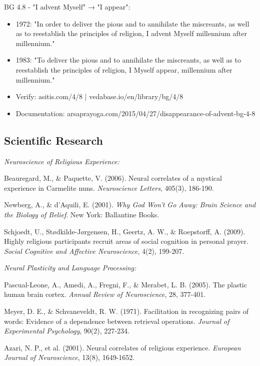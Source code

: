 \documentclass[12pt]{article}
\begin{document}
BG 4.8 - "I advent Myself" → "I appear":
\begin{itemize}
\item 1972: "In order to deliver the pious and to annihilate the miscreants, as well as to reestablish the principles of religion, I advent Myself millennium after millennium."
\item 1983: "To deliver the pious and to annihilate the miscreants, as well as to reestablish the principles of religion, I Myself appear, millennium after millennium."
\item Verify: asitis.com/4/8 | vedabase.io/en/library/bg/4/8
\item Documentation: arsaprayoga.com/2015/04/27/disappearance-of-advent-bg-4-8
\end{itemize}

\vspace{0.5cm}

\subsection*{Scientific Research}

\textit{Neuroscience of Religious Experience:}

Beauregard, M., \& Paquette, V. (2006). Neural correlates of a mystical experience in Carmelite nuns. \textit{Neuroscience Letters}, 405(3), 186-190.

Newberg, A., \& d'Aquili, E. (2001). \textit{Why God Won't Go Away: Brain Science and the Biology of Belief}. New York: Ballantine Books.

Schjoedt, U., Stødkilde-Jørgensen, H., Geertz, A. W., \& Roepstorff, A. (2009). Highly religious participants recruit areas of social cognition in personal prayer. \textit{Social Cognitive and Affective Neuroscience}, 4(2), 199-207.

\textit{Neural Plasticity and Language Processing:}

Pascual-Leone, A., Amedi, A., Fregni, F., \& Merabet, L. B. (2005). The plastic human brain cortex. \textit{Annual Review of Neuroscience}, 28, 377-401.

Meyer, D. E., \& Schvaneveldt, R. W. (1971). Facilitation in recognizing pairs of words: Evidence of a dependence between retrieval operations. \textit{Journal of Experimental Psychology}, 90(2), 227-234.

Azari, N. P., et al. (2001). Neural correlates of religious experience. \textit{European Journal of Neuroscience}, 13(8), 1649-1652.
\end{document}
